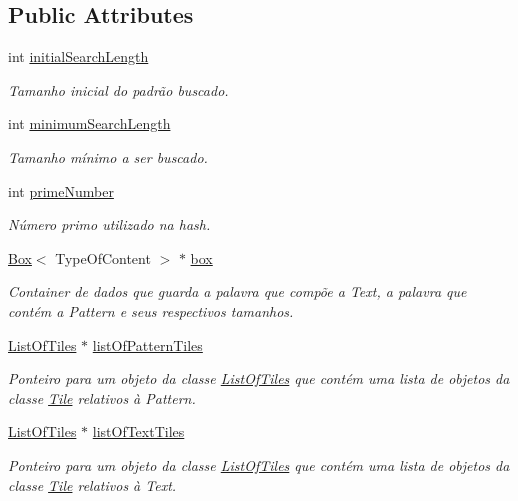 \subsection*{Public Attributes}
\begin{DoxyCompactItemize}
\item 
int \hyperlink{classRKRGST_ad4e450cff7656afab26be8eb27c4f87c}{initial\+Search\+Length}
\begin{DoxyCompactList}\small\item\em Tamanho inicial do padrão buscado. \end{DoxyCompactList}\item 
int \hyperlink{classRKRGST_aaf28410e7b3c34bcfbffd17cd0d014b2}{minimum\+Search\+Length}
\begin{DoxyCompactList}\small\item\em Tamanho mínimo a ser buscado. \end{DoxyCompactList}\item 
int \hyperlink{classRKRGST_aea66b780697be63c91342029335ad8ef}{prime\+Number}
\begin{DoxyCompactList}\small\item\em Número primo utilizado na hash. \end{DoxyCompactList}\item 
\hyperlink{classBox}{Box}$<$ Type\+Of\+Content $>$ $\ast$ \hyperlink{classRKRGST_ae0737f82fb5c44b9edd663a9ed00a7fe}{box}
\begin{DoxyCompactList}\small\item\em Container de dados que guarda a palavra que compõe a Text, a palavra que contém a Pattern e seus respectivos tamanhos. \end{DoxyCompactList}\item 
\hyperlink{classListOfTiles}{List\+Of\+Tiles} $\ast$ \hyperlink{classRKRGST_ad2335f6d83faf621a99b66c680f32b5d}{list\+Of\+Pattern\+Tiles}
\begin{DoxyCompactList}\small\item\em Ponteiro para um objeto da classe \hyperlink{classListOfTiles}{List\+Of\+Tiles} que contém uma lista de objetos da classe \hyperlink{classTile}{Tile} relativos à Pattern. \end{DoxyCompactList}\item 
\hyperlink{classListOfTiles}{List\+Of\+Tiles} $\ast$ \hyperlink{classRKRGST_a03afdb90a534a2420da654ddadb032c2}{list\+Of\+Text\+Tiles}
\begin{DoxyCompactList}\small\item\em Ponteiro para um objeto da classe \hyperlink{classListOfTiles}{List\+Of\+Tiles} que contém uma lista de objetos da classe \hyperlink{classTile}{Tile} relativos à Text. \end{DoxyCompactList}\item 

\end{DoxyCompactItemize}
